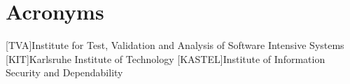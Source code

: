 \chapter{Acronyms}

\begin{acronym}[XXXXXX]

    [TVA]{Institute for Test, Validation and Analysis of Software Intensive Systems}
    [KIT]{Karlsruhe Institute of Technology}
    [KASTEL]{Institute of Information Security and Dependability}

\end{acronym}
